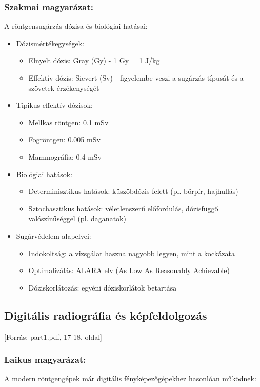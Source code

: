 \documentclass[a4paper,12pt]{article}
\begin{document}
\subsubsection{Szakmai magyarázat:} A röntgensugárzás dózisa és biológiai hatásai:

\begin{itemize} \item Dózismértékegységek: \begin{itemize} \item Elnyelt dózis: Gray (Gy) - 1 Gy = 1 J/kg \item Effektív dózis: Sievert (Sv) - figyelembe veszi a sugárzás típusát és a szövetek érzékenységét \end{itemize} \item Tipikus effektív dózisok: \begin{itemize} \item Mellkas röntgen: 0.1 mSv \item Fogröntgen: 0.005 mSv \item Mammográfia: 0.4 mSv \end{itemize} \item Biológiai hatások: \begin{itemize} \item Determinisztikus hatások: küszöbdózis felett (pl. bőrpír, hajhullás) \item Sztochasztikus hatások: véletlenszerű előfordulás, dózisfüggő valószínűséggel (pl. daganatok) \end{itemize} \item Sugárvédelem alapelvei: \begin{itemize} \item Indokoltság: a vizsgálat haszna nagyobb legyen, mint a kockázata \item Optimalizálás: ALARA elv (As Low As Reasonably Achievable) \item Dóziskorlátozás: egyéni dóziskorlátok betartása \end{itemize} \end{itemize}

\subsection{Digitális radiográfia és képfeldolgozás} [Forrás: part1.pdf, 17-18. oldal]

\subsubsection{Laikus magyarázat:} A modern röntgengépek már digitális fényképezőgépekhez hasonlóan működnek:
\end{document}
